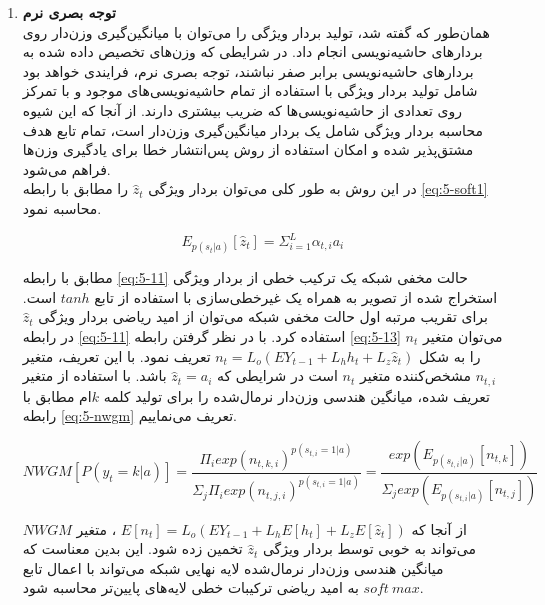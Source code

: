 \begin{enumerate}
	\item \textbf{توجه بصری نرم} \\
	
	همان‌طور که گفته شد، تولید بردار ويژگی را می‌توان با میانگین‌گیری وزن‌دار روی بردارهای حاشیه‌نویسی انجام داد. در شرایطی که وزن‌های تخصیص داده شده به بردارهای حاشیه‌نویسی برابر صفر نباشند، توجه بصری نرم، فرایندی خواهد بود شامل تولید بردار ویژگی با استفاده از تمام حاشیه‌نویسی‌های موجود و با تمرکز روی تعدادی از حاشیه‌نویسی‌ها که ضریب بیشتری دارند. از آنجا که این شیوه محاسبه بردار ویژگی شامل یک بردار میانگین‌گیری وزن‌دار است، تمام تابع هدف مشتق‌پذیر شده و امکان استفاده از روش پس‌انتشار خطا برای یادگیری وزن‌ها فراهم می‌شود.
	\\
	در این روش به طور کلی می‌توان بردار ویژگی $\hat{z}_t$ را مطابق با رابطه \eqref{eq:5-soft1} محاسبه نمود.
	
	\begin{equation}
	E_{p(s_t | a)} [\hat{z}_t] = \Sigma_{i=1}^L \alpha_{t,i} a_i
	\label{eq:5-soft1}
	\end{equation}
	
	مطابق با رابطه \eqref{eq:5-11} حالت مخفی شبکه یک ترکیب خطی از بردار ویژگی استخراج شده از تصویر به همراه یک غیرخطی‌سازی با استفاده از تابع $tanh$ است. برای تقریب مرتبه اول حالت مخفی شبکه می‌توان از امید ریاضی بردار ویژگی $\hat{z}_t$ در رابطه \eqref{eq:5-11} استفاده کرد. با در نظر گرفتن رابطه \eqref{eq:5-13} می‌توان متغیر $n_t$ را به شکل 
	$n_t = L_o (EY_{t-1} + L_h h_t + L_z \hat{z}_t) $
	تعریف نمود. با این تعریف،‌ متغیر $n_{t,i}$ مشخص‌کننده متغیر $n_t$ است در شرایطی که $\hat{z}_t = a_i$ باشد. با استفاده از متغیر تعریف شده، میانگین هندسی وزن‌دار نرمال‌شده  را برای تولید کلمه $k$ام مطابق با رابطه \eqref{eq:5-nwgm} تعریف می‌نماییم.
	
	\begin{equation}
	NWGM[P(y_t = k | a)] = \frac{\Pi_i exp(n_{t,k,i})^{p(s_{t,i} = 1 | a)}}{\Sigma_j \Pi_i exp(n_{t,j,i})^{p(s_{t,i} = 1 | a)}} = \frac{exp(E_{p(s_{t,i}|a)}[n_{t,k}])}{\Sigma_j exp(E_{p(s_{t,i}|a)}[n_{t,j}])}
	\label{eq:5-nwgm}
	\end{equation}
	
	از آنجا که 
	$E[n_t] = L_o(EY_{t-1} + L_h E[h_t] + L_z E[\hat{z}_t])$
	، متغیر $NWGM$ می‌تواند به خوبی توسط بردار ویژگی $\hat{z}_t$ تخمین زده شود. این بدین معناست که میانگین هندسی وزن‌دار نرمال‌شده لایه نهایی شبکه می‌تواند با اعمال تابع $soft\>max$ به امید ریاضی ترکیبات خطی لایه‌های پایین‌تر محاسبه شود. 
	
	
\end{enumerate}


